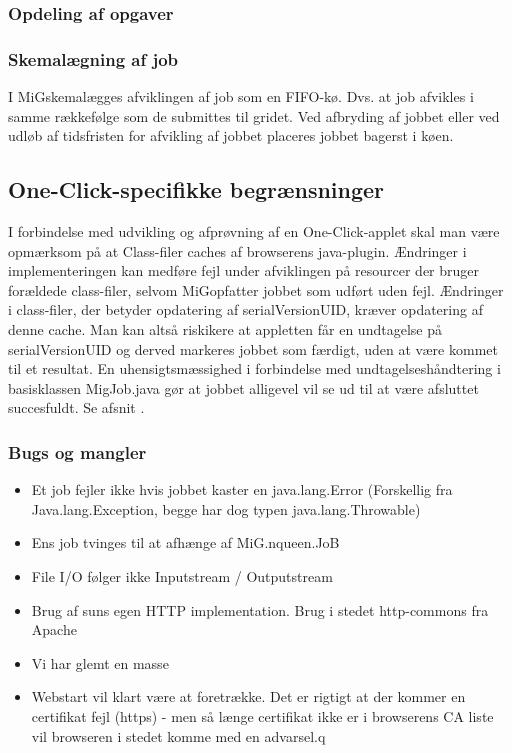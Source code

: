 \documentclass[draft,a4paper,10pt]{article}
\newcommand{\mig}{MiG}
\newcommand{\oc}{One-Click}
\begin{document}
\subsubsection{Opdeling af opgaver}


\subsubsection{Skemalægning af job}
I \mig skemalægges afviklingen af job som en FIFO-kø. Dvs. at job afvikles i samme rækkefølge som de submittes til gridet. Ved afbryding af jobbet eller ved udløb af tidsfristen for afvikling af jobbet placeres jobbet bagerst i køen.  


\subsection{\oc-specifikke begrænsninger}

I forbindelse med udvikling og afprøvning af en \oc-applet skal man være opmærksom på at Class-filer caches af browserens java-plugin. Ændringer i implementeringen kan medføre fejl under afviklingen på resourcer der bruger forældede class-filer, selvom \mig opfatter jobbet som udført uden fejl. Ændringer i class-filer, der betyder opdatering af serialVersionUID, kræver opdatering af denne cache. Man kan altså riskikere at appletten får en undtagelse på serialVersionUID og derved markeres jobbet som færdigt, uden at være kommet til et resultat. En uhensigtsmæssighed i forbindelse med undtagelseshåndtering i basisklassen MigJob.java gør at jobbet alligevel vil se ud til at være afsluttet succesfuldt. Se afsnit \cite{bugs}. 


\subsubsection{Bugs og mangler}\label{bugs}
\begin{itemize}
	\item Et job fejler ikke hvis jobbet kaster en java.lang.Error (Forskellig fra Java.lang.Exception, begge har dog typen java.lang.Throwable)
	\item Ens job tvinges til at afhænge af MiG.nqueen.JoB
	\item File I/O følger ikke Inputstream / Outputstream	
	\item Brug af suns egen HTTP implementation. Brug i stedet http-commons fra Apache
	\item Vi har glemt en masse 
	\item Webstart vil klart være at foretrække. Det er rigtigt at der kommer en certifikat fejl (https) - men så længe certifikat ikke er i browserens CA liste vil browseren i stedet komme med en advarsel.q
\end{itemize}
\end{document}
